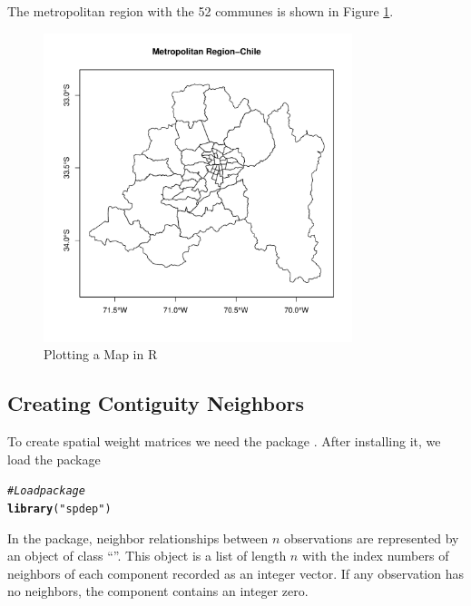 \documentclass[english,12pt]{book}\usepackage[]{graphicx}\usepackage[]{xcolor}
\makeatletter
\newcommand{\hlstr}[1]{\textcolor[rgb]{0.192,0.494,0.8}{#1}}%
\newcommand{\hlcom}[1]{\textcolor[rgb]{0.678,0.584,0.686}{\textit{#1}}}%
\newcommand{\hlstd}[1]{\textcolor[rgb]{0.345,0.345,0.345}{#1}}%
\newcommand{\hlkwd}[1]{\textcolor[rgb]{0.737,0.353,0.396}{\textbf{#1}}}%
\newenvironment{kframe}{%
 \def\at@end@of@kframe{}%
 \ifinner\ifhmode%
  \def\at@end@of@kframe{\end{minipage}}%
  \begin{minipage}{\columnwidth}%
 \fi\fi%
 \def\FrameCommand##1{\hskip\@totalleftmargin \hskip-\fboxsep
 \colorbox{shadecolor}{##1}\hskip-\fboxsep
     \hskip-\linewidth \hskip-\@totalleftmargin \hskip\columnwidth}%
 \MakeFramed {\advance\hsize-\width
   \@totalleftmargin\z@ \linewidth\hsize
   \@setminipage}}%
 {\par\unskip\endMakeFramed%
 \at@end@of@kframe}
\newenvironment{knitrout}{}{} %
\makeatother
\begin{document}
The metropolitan region with the 52 communes is shown in Figure \ref{fig:plot_mr}.

\begin{figure}[h]
  \caption{Plotting a Map in R}
    \label{fig:plot_mr}
\begin{knitrout}
\color{fgcolor}

{\centering \includegraphics[width=9cm,height=9cm]{figure/plot_mr-1} 

}


\end{knitrout}
\end{figure}

\subsection{Creating Contiguity Neighbors}

To create spatial weight matrices we need the  package \citep{bivand2013computing}. After installing it, we load the package

\begin{knitrout}
\color{fgcolor}\begin{kframe}
\begin{alltt}
\hlcom{#Load package}
\hlkwd{library}\hlstd{(}\hlstr{"spdep"}\hlstd{)}
\end{alltt}
\end{kframe}
\end{knitrout}

In the  package, neighbor relationships between $n$ observations are represented by an object of class ``''. This object is a list of length $n$ with the index numbers of neighbors of each component recorded as an integer vector. If any observation has no neighbors, the component contains an integer zero. 
\end{document}
